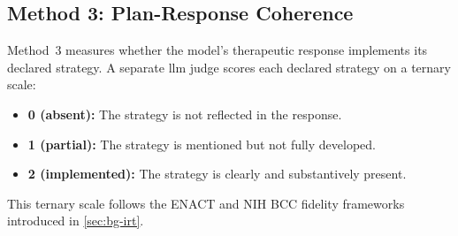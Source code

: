 \subsection{Method 3: Plan-Response Coherence}
\label{sec:meth-m3}
%

Method~3 measures whether the model's therapeutic response implements its
declared strategy. A separate \gls{llm} judge scores each declared strategy
on a ternary scale:

\begin{itemize}
  \item \textbf{0 (absent):} The strategy is not reflected in the response.
  \item \textbf{1 (partial):} The strategy is mentioned but not fully developed.
  \item \textbf{2 (implemented):} The strategy is clearly and substantively present.
\end{itemize}

This ternary scale follows the ENACT and NIH BCC fidelity frameworks
introduced in \autoref{sec:bg-irt}.

